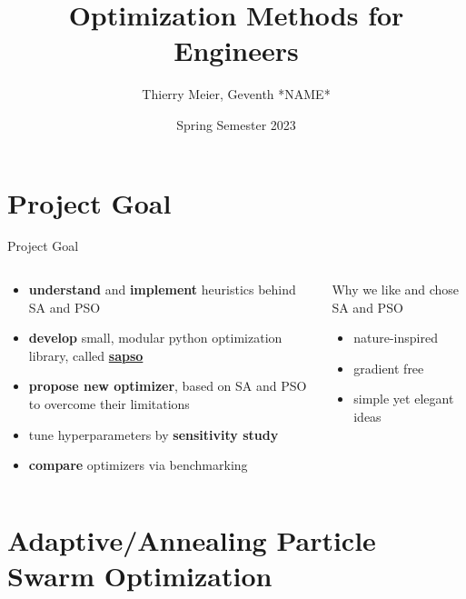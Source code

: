 \documentclass[11pt,aspectratio=169]{beamer}
\title{Optimization Methods for Engineers}
\date[July 2023]{Spring Semester 2023}
\author{Thierry Meier, Geventh *NAME*}
\institute{Optimization Methods for Engineers\\227-0707-00L}
\begin{document}
\def\titlefigure{elements/eggholder.pdf}        %

%
%

\titleframe

%
%

\tocframe

%
%

\section{Project Goal}

%
%

\begin{frame}[fragile]{Project Goal}
    \begin{columns}
    \begin{column}{0.5\textwidth}


        \begin{itemize}
            \item \textbf{understand} and \textbf{implement} heuristics behind SA and PSO
            \item \textbf{develop} small, modular python optimization library, called \href{https://github.com/thmeier}{\textbf{sapso}}
            \item \textbf{propose new optimizer}, based on SA and PSO to overcome their limitations
            \item tune hyperparameters by \textbf{sensitivity study}
            \item \textbf{compare} optimizers via benchmarking
        \end{itemize}

    \end{column}
    \begin{column}{0.5\textwidth}
        Why we like and chose SA and PSO
        \begin{itemize}
            \item nature-inspired
            \item gradient free
            \item simple yet elegant ideas
        \end{itemize}
    \end{column}
    \end{columns}
\end{frame}

%
%

\section{Adaptive/Annealing Particle Swarm Optimization}
\end{document}
